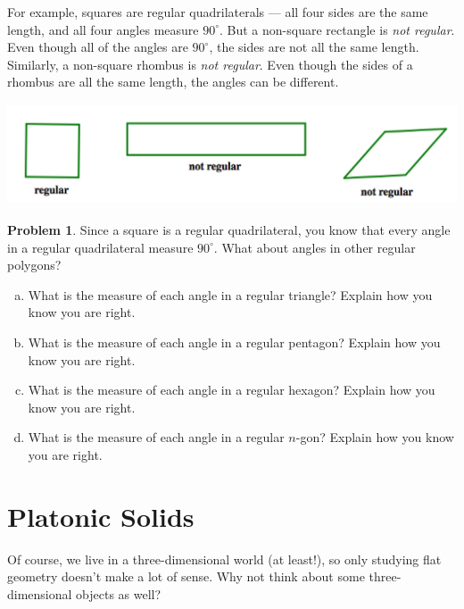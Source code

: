 \documentclass[12pt, reqno]{amsart}
\theoremstyle{remark}
\theoremstyle{definition}
\newtheorem{problem}{Problem}
\numberwithin{equation}{section}  %
\begin{document}
For example, squares are regular quadrilaterals --- all four sides are the same length, and all four angles measure $90^\circ$.  But  a non-square rectangle is \emph{not regular}.  Even though all of the angles are $90^\circ$, the sides are not all the same length.  Similarly,  a non-square rhombus is \emph{not regular}.  Even though the sides of a rhombus are all the same length, the angles can be different.  

\begin{center}
\includegraphics[height=3cm]{regnotreg}
\end{center}

\bigskip

\begin{problem}
Since a square is a regular quadrilateral, you know that every angle in a regular quadrilateral measure $90^\circ$.  What about angles in other regular polygons?

\begin{enumerate}[(a)]
\item
What is the measure of each angle in a regular triangle?  Explain how you know you are right.\\

\item
What is the measure of each angle in a regular pentagon?  Explain how you know you are right.\\

\item
What is the measure of each angle in a regular hexagon?  Explain how you know you are right.\\

\item
What is the measure of each angle in a regular $n$-gon?  Explain how you know you are right.\\
\end{enumerate}
\end{problem}


\newpage


\section{Platonic Solids}
Of course, we live in a three-dimensional world (at least!), so only studying flat geometry doesn't make a lot of sense.  Why not think about some three-dimensional objects as well?
\end{document}
